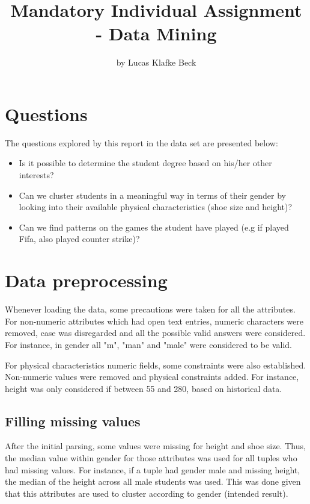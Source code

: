 \documentclass{article}
\title{Mandatory Individual Assignment - Data Mining}
\author{by Lucas Klafke Beck}
\begin{document}
\maketitle

\section* {Questions}

The questions explored by this report in the data set are presented below:
\begin{itemize}
  \item Is it possible to determine the student degree based on his/her other interests?
  \item Can we cluster students in a meaningful way in terms of their gender by looking into their available physical characteristics (shoe size and height)?
  \item Can we find patterns on the games the student have played (e.g if played Fifa, also played counter strike)?
\end{itemize}

\section* {Data preprocessing}

Whenever loading the data, some precautions were taken for all the attributes. For non-numeric attributes which had open text entries, numeric characters were removed, case was disregarded and all the possible valid answers were considered. For instance, in gender all "m", "man" and "male" were considered to be valid.

For physical characteristics numeric fields, some constraints were also established. Non-numeric values were removed and physical constraints added. For instance, height was only considered if between 55 and 280, based on historical data.

\subsection* {Filling missing values}
After the initial parsing, some values were missing for height and shoe size. Thus, the median value within gender for those attributes was used for all tuples who had missing values. For instance, if a tuple had gender male and missing height, the median of the height across all male students was used. This was done given that this attributes are used to cluster according to gender (intended result). 
\end{document}
